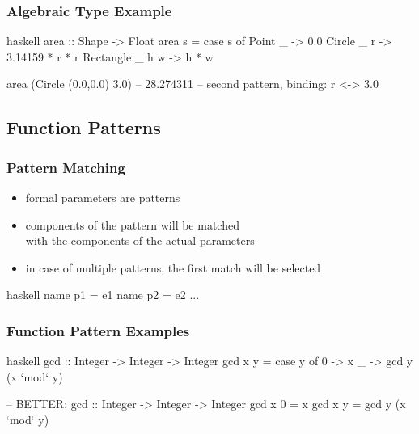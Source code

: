 \documentclass[dvipsnames]{beamer}
\theoremstyle{plain}
\begin{document}
\begin{frame}[fragile]
  \frametitle{Algebraic Type Example}

  \begin{exampleblock}{}
    \begin{pygments}{haskell}
area :: Shape -> Float
area s =
    case s of
      Point     _     -> 0.0
      Circle    _ r   -> 3.14159 * r * r
      Rectangle _ h w -> h * w

area (Circle (0.0,0.0) 3.0) -- 28.274311
-- second pattern, binding: r <-> 3.0
    \end{pygments}
  \end{exampleblock}
\end{frame}

\subsection{Function Patterns}

\begin{frame}[fragile]
  \frametitle{Pattern Matching}

  \begin{itemize}
    \item formal parameters are patterns
    \item components of the pattern will be matched\\
      with the components of the actual parameters
    \item in case of multiple patterns, the first match will be selected
  \end{itemize}

  \begin{block}{}
    \begin{pygments}{haskell}
name p1 = e1
name p2 = e2
...
    \end{pygments}
  \end{block}
\end{frame}

\begin{frame}[fragile]
  \frametitle{Function Pattern Examples}

  \begin{exampleblock}{}
    \begin{pygments}{haskell}
gcd :: Integer -> Integer -> Integer
gcd x y =
    case y of
      0 -> x
      _ -> gcd y (x `mod` y)

-- BETTER:
gcd :: Integer -> Integer -> Integer
gcd x 0 = x
gcd x y = gcd y (x `mod` y)
    \end{pygments}
  \end{exampleblock}
\end{frame}
\end{document}
